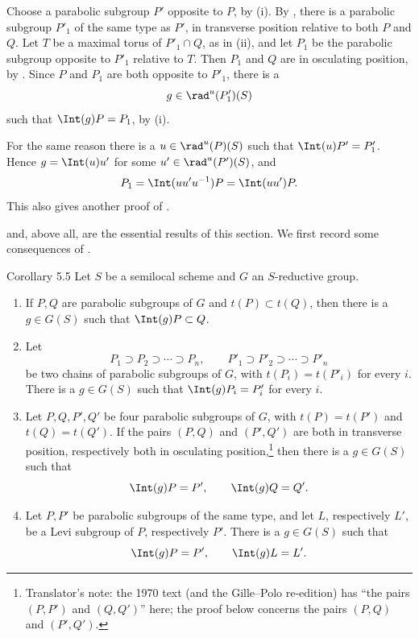 Choose a parabolic subgroup \(P'\) opposite to \(P\), by
\textup{(i)}.  By , there is a parabolic subgroup \(P'_1\) of
the same type as \(P'\), in transverse position relative to both
\(P\) and \(Q\).  Let \(T\) be a maximal torus of \(P'_1\cap Q\),
as in \textup{(ii)}, and let \(P_1\) be the parabolic subgroup
opposite to \(P'_1\) relative to \(T\).  Then \(P_1\) and \(Q\) are
in osculating position, by .  Since \(P\) and \(P_1\) are both
opposite to \(P'_1\), there is a
\[
 g\in\rad^u(P'_1)(S)
\]
such that \(\Int(g)P=P_1\), by \textup{(i)}.
\SGAQED

For the same reason there is a \(u\in\rad^u(P)(S)\) such that
\(\Int(u)P'=P'_1\).  Hence \(g=\Int(u)u'\) for some
\(u'\in\rad^u(P')(S)\), and
\[
 P_1=\Int(uu'u^{-1})P=\Int(uu')P.
\]
This also gives another proof of .

 and, above all,  are the essential results of this section.
We first record some consequences of .

\begin{sgastatement}{Corollary 5.5}
Let \(S\) be a semilocal scheme and \(G\) an \(S\)-reductive group.
\begin{enumerate}[label=\textup{(\roman*)}]
\item If \(P,Q\) are parabolic subgroups of \(G\) and
\(t(P)\subset t(Q)\), then there is a \(g\in G(S)\) such that
\(\Int(g)P\subset Q\).
\item Let
\[
 P_1\supset P_2\supset\cdots\supset P_n,\qquad
 P'_1\supset P'_2\supset\cdots\supset P'_n
\]
be two chains of parabolic subgroups of \(G\), with
\(t(P_i)=t(P'_i)\) for every \(i\).  There is a \(g\in G(S)\) such
that \(\Int(g)P_i=P'_i\) for every \(i\).
\item Let \(P,Q,P',Q'\) be four parabolic subgroups of \(G\), with
\(t(P)=t(P')\) and \(t(Q)=t(Q')\).  If the pairs \((P,Q)\) and
\((P',Q')\) are both in transverse position, respectively both in
osculating position,\footnote{Translator's note: the 1970 text (and the Gille--Polo re-edition) has
``the pairs \((P,P')\) and \((Q,Q')\)'' here; the proof below concerns the
pairs \((P,Q)\) and \((P',Q')\).} then there is a \(g\in G(S)\) such that
\[
 \Int(g)P=P',\qquad\Int(g)Q=Q'.
\]
\item Let \(P,P'\) be parabolic subgroups of the same type, and let
\(L\), respectively \(L'\), be a Levi subgroup of \(P\), respectively
\(P'\).  There is a \(g\in G(S)\) such that
\[
 \Int(g)P=P',\qquad\Int(g)L=L'.
\]
\end{enumerate}
\end{sgastatement}

